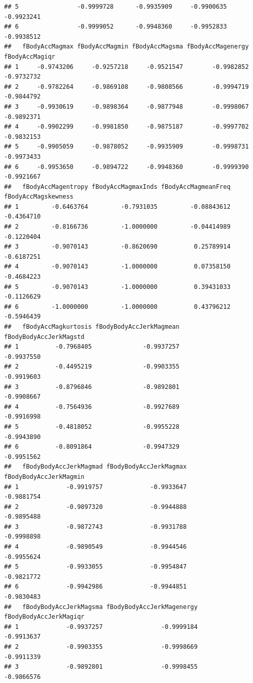 \documentclass[
]{article}
\begin{document}
\begin{verbatim}
## 5                -0.9999728      -0.9935909     -0.9900635     -0.9923241
## 6                -0.9999052      -0.9948360     -0.9952833     -0.9938512
##   fBodyAccMagmax fBodyAccMagmin fBodyAccMagsma fBodyAccMagenergy fBodyAccMagiqr
## 1     -0.9743206     -0.9257218     -0.9521547        -0.9982852     -0.9732732
## 2     -0.9782264     -0.9869108     -0.9808566        -0.9994719     -0.9844792
## 3     -0.9930619     -0.9898364     -0.9877948        -0.9998067     -0.9892371
## 4     -0.9902299     -0.9981850     -0.9875187        -0.9997702     -0.9832153
## 5     -0.9905059     -0.9878052     -0.9935909        -0.9998731     -0.9973433
## 6     -0.9953650     -0.9894722     -0.9948360        -0.9999390     -0.9921667
##   fBodyAccMagentropy fBodyAccMagmaxInds fBodyAccMagmeanFreq fBodyAccMagskewness
## 1         -0.6463764         -0.7931035         -0.08843612          -0.4364710
## 2         -0.8166736         -1.0000000         -0.04414989          -0.1220404
## 3         -0.9070143         -0.8620690          0.25789914          -0.6187251
## 4         -0.9070143         -1.0000000          0.07358150          -0.4684223
## 5         -0.9070143         -1.0000000          0.39431033          -0.1126629
## 6         -1.0000000         -1.0000000          0.43796212          -0.5946439
##   fBodyAccMagkurtosis fBodyBodyAccJerkMagmean fBodyBodyAccJerkMagstd
## 1          -0.7968405              -0.9937257             -0.9937550
## 2          -0.4495219              -0.9903355             -0.9919603
## 3          -0.8796846              -0.9892801             -0.9908667
## 4          -0.7564936              -0.9927689             -0.9916998
## 5          -0.4818052              -0.9955228             -0.9943890
## 6          -0.8091864              -0.9947329             -0.9951562
##   fBodyBodyAccJerkMagmad fBodyBodyAccJerkMagmax fBodyBodyAccJerkMagmin
## 1             -0.9919757             -0.9933647             -0.9881754
## 2             -0.9897320             -0.9944888             -0.9895488
## 3             -0.9872743             -0.9931788             -0.9998898
## 4             -0.9890549             -0.9944546             -0.9955624
## 5             -0.9933055             -0.9954847             -0.9821772
## 6             -0.9942986             -0.9944851             -0.9830483
##   fBodyBodyAccJerkMagsma fBodyBodyAccJerkMagenergy fBodyBodyAccJerkMagiqr
## 1             -0.9937257                -0.9999184             -0.9913637
## 2             -0.9903355                -0.9998669             -0.9911339
## 3             -0.9892801                -0.9998455             -0.9866576

\end{verbatim}
\end{document}
